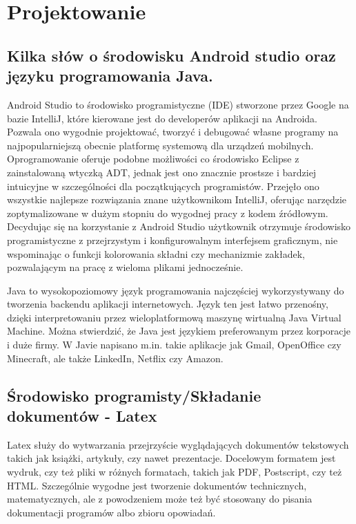 \newpage
\section{Projektowanie}		%

\subsection{Kilka słów o środowisku Android studio oraz języku programowania Java.}
\hspace{0.60cm}Android Studio to środowisko programistyczne (IDE) stworzone przez Google na bazie IntelliJ, które kierowane jest do developerów aplikacji na Androida. Pozwala ono wygodnie projektować, tworzyć i debugować własne programy na najpopularniejszą obecnie platformę systemową dla urządzeń mobilnych. Oprogramowanie oferuje podobne możliwości co środowisko Eclipse z zainstalowaną wtyczką ADT, jednak jest ono znacznie prostsze i bardziej intuicyjne w szczególności dla początkujących programistów. Przejęło ono wszystkie najlepsze rozwiązania znane użytkownikom IntelliJ, oferując narzędzie zoptymalizowane w dużym stopniu do wygodnej pracy z kodem źródłowym. Decydując się na korzystanie z Android Studio użytkownik otrzymuje środowisko programistyczne z przejrzystym i konfigurowalnym interfejsem graficznym, nie wspominając o funkcji kolorowania składni czy mechanizmie zakładek, pozwalającym na pracę z wieloma plikami jednocześnie. \newline

Java to wysokopoziomowy język programowania najczęściej wykorzystywany do tworzenia backendu aplikacji internetowych. Język ten jest łatwo przenośny, dzięki interpretowaniu przez wieloplatformową maszynę wirtualną Java Virtual Machine. Można stwierdzić, że Java jest językiem preferowanym przez korporacje i duże firmy. W Javie napisano m.in. takie aplikacje jak Gmail, OpenOffice czy Minecraft, ale także LinkedIn, Netflix czy Amazon.

\newpage


\subsection{Środowisko programisty/Składanie dokumentów - Latex}
\hspace{0.60cm}Latex służy do wytwarzania przejrzyście wyglądających dokumentów tekstowych takich jak książki, artykuły, czy nawet prezentacje. Docelowym formatem jest wydruk, czy też pliki w różnych formatach, takich jak PDF, Postscript, czy też HTML. Szczególnie wygodne jest tworzenie dokumentów technicznych, matematycznych, ale z powodzeniem może też być stosowany do pisania dokumentacji programów albo zbioru opowiadań.\newline

